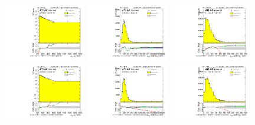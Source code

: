 \begin{figure}[htbp!]
\begin{center}
\includegraphics[width=0.32\textwidth,angle=-90]{figures/boosted/Reweight/Fits/Moriond_NoTag_3Trk_subl_Incl_leadHCand_Pt_m_1.pdf}
\includegraphics[width=0.32\textwidth,angle=-90]{figures/boosted/Reweight/Fits/Moriond_NoTag_3Trk_subl_Incl_leadHCand_trk0_Pt.pdf}
\includegraphics[width=0.32\textwidth,angle=-90]{figures/boosted/Reweight/Fits/Moriond_NoTag_3Trk_subl_Incl_leadHCand_trk1_Pt.pdf} \\
\includegraphics[width=0.32\textwidth,angle=-90]{figures/boosted/Reweight/Fits/Moriond_bkg_0_NoTag_3Trk_subl_Incl_leadHCand_Pt_m_1.pdf}
\includegraphics[width=0.32\textwidth,angle=-90]{figures/boosted/Reweight/Fits/Moriond_bkg_0_NoTag_3Trk_subl_Incl_leadHCand_trk0_Pt.pdf}
\includegraphics[width=0.32\textwidth,angle=-90]{figures/boosted/Reweight/Fits/Moriond_bkg_0_NoTag_3Trk_subl_Incl_leadHCand_trk1_Pt.pdf} \\

\end{center}
\end{figure}
